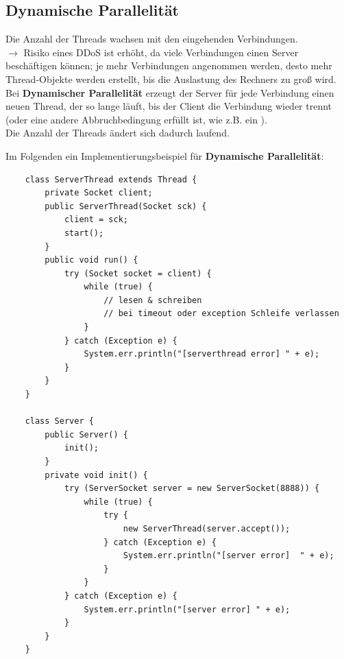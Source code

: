 \subsection*{Dynamische Parallelität}
Die Anzahl der Threads wachsen mit den eingehenden Verbindungen.\\

$\rightarrow$ Risiko eines DDoS ist erhöht, da viele Verbindungen einen Server beschäftigen können; je mehr Verbindungen angenommen werden, desto mehr Thread-Objekte werden erstellt, bis die Auslastung des Rechners zu groß wird.\\

\noindent
Bei \textbf{Dynamischer Parallelität} erzeugt der Server für jede Verbindung einen neuen Thread, der so lange läuft, bis der Client die Verbindung wieder trennt (oder eine andere Abbruchbedingung erfüllt ist, wie z.B. ein ).\\
Die Anzahl der Threads ändert sich dadurch laufend.

\noindent
Im Folgenden ein Implementierungsbeispiel für \textbf{Dynamische Parallelität}:
\begin{verbatim}
    class ServerThread extends Thread {
        private Socket client;
        public ServerThread(Socket sck) {
            client = sck;
            start();
        }
        public void run() {
            try (Socket socket = client) {
                while (true) {
                    // lesen & schreiben
                    // bei timeout oder exception Schleife verlassen
                }
            } catch (Exception e) {
                System.err.println("[serverthread error] " + e);
            }
        }
    }

    class Server {
        public Server() {
            init();
        }
        private void init() {
            try (ServerSocket server = new ServerSocket(8888)) {
                while (true) {
                    try {
                        new ServerThread(server.accept());
                    } catch (Exception e) {
                        System.err.println("[server error]  " + e);
                    }
                }
            } catch (Exception e) {
                System.err.println("[server error] " + e);
            }
        }
    }
\end{verbatim}

